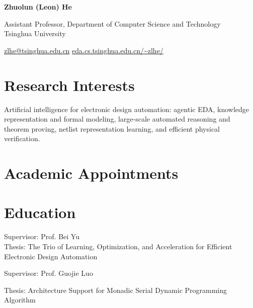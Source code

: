 \documentclass[11pt]{article}
\begin{document}
{\LARGE\bfseries Zhuolun (Leon) He}\par
Assistant Professor, Department of Computer Science and Technology\\
Tsinghua University\par
\href{mailto:zlhe@tsinghua.edu.cn}{zlhe@tsinghua.edu.cn}\enspace\textperiodcentered\enspace
\href{https://eda.cs.tsinghua.edu.cn/\%7Ezlhe/}{eda.cs.tsinghua.edu.cn/\textasciitilde zlhe/}\par

\section{Research Interests}
Artificial intelligence for electronic design automation: agentic EDA, knowledge representation and formal modeling, large-scale automated reasoning and theorem proving, netlist representation learning, and efficient physical verification.

\section{Academic Appointments}
\entrygap
{}

\section{Education}
\begin{entrydetails}
Supervisor: Prof. Bei Yu\\
Thesis: The Trio of Learning, Optimization, and Acceleration for Efficient Electronic Design Automation
\end{entrydetails}
\entrygap
{}
\begin{entrydetails}Supervisor: Prof. Guojie Luo\end{entrydetails}
\entrygap
{}
\begin{entrydetails}Thesis: Architecture Support for Monadic Serial Dynamic Programming Algorithm\end{entrydetails}
\end{document}
